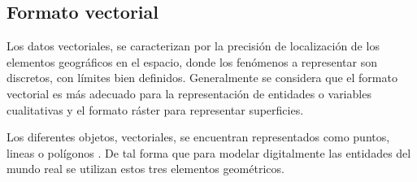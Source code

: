 \subsection{Formato vectorial}
Los datos vectoriales, se caracterizan por la precisión de localización de los elementos
geográficos en el espacio, donde los fenómenos a representar son discretos, con límites bien
definidos. Generalmente se considera que el formato vectorial es más adecuado para la
representación de entidades o variables cualitativas y el formato ráster para representar
superficies\cite{fAlonsoSig2006}.

Los diferentes objetos, vectoriales, se encuentran representados como puntos, lineas o polígonos
\cite{fAlonsoSig2006}. De tal forma que para modelar digitalmente las entidades del mundo real se
utilizan estos tres elementos geométricos.

